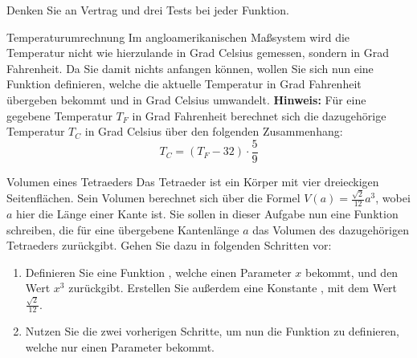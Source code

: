 \documentclass{../preamble}
\date{14.12.2020 - 18.12.2020}
\begin{document}
\maketitle

\makedisclaimer

\clearpage

\setcounter{task}{1}

\begin{tcolorbox}
	Denken Sie an Vertrag und drei Tests bei jeder Funktion.
\end{tcolorbox}

\begin{task}[credit = \stars{0}{3}]{Temperaturumrechnung}
	Im angloamerikanischen Maßsystem wird die Temperatur nicht wie hierzulande in Grad Celsius gemessen, sondern in Grad Fahrenheit. Da Sie damit nichts anfangen können, wollen Sie sich nun eine Funktion  definieren, welche die aktuelle Temperatur in Grad Fahrenheit übergeben bekommt und in Grad Celsius umwandelt.
	\br
	\textbf{Hinweis:} Für eine gegebene Temperatur \(T_F\) in Grad Fahrenheit berechnet sich die dazugehörige Temperatur \(T_C\) in Grad Celsius über den folgenden Zusammenhang:
	\begin{equation*}
		T_C = (T_F - 32) \cdot \frac{5}{9}
	\end{equation*}

	\begin{solution}
		
	\end{solution}
\end{task}

\clearpage

\begin{task}[credit = \stars{1}{3}]{Volumen eines Tetraeders}
	Das Tetraeder ist ein Körper mit vier dreieckigen Seitenflächen. Sein Volumen berechnet sich über die Formel \(V(a) = \frac{\sqrt{2}}{12} a^3\), wobei \(a\) hier die Länge einer Kante ist. Sie sollen in dieser Aufgabe nun eine Funktion  schreiben, die für eine übergebene Kantenlänge \(a\) das Volumen des dazugehörigen Tetraeders zurückgibt. Gehen Sie dazu in folgenden Schritten vor:
	\begin{enumerate}
		\item Definieren Sie eine Funktion , welche einen Parameter \(x\) bekommt, und den Wert \(x^3\) zurückgibt. Erstellen Sie außerdem eine Konstante , mit dem Wert \(\frac{\sqrt{2}}{12}\).
		\item Nutzen Sie die zwei vorherigen Schritte, um nun die Funktion  zu definieren, welche nur einen Parameter  bekommt.
	\end{enumerate}

	\begin{solution}
		
	\end{solution}
\end{task}
\end{document}

